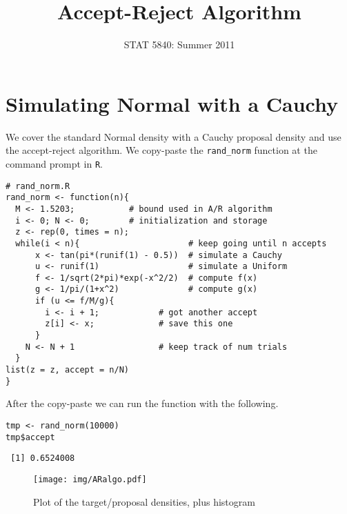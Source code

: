 \documentclass[11pt,english]{article}
\title{Accept-Reject Algorithm}
\date{STAT 5840: Summer 2011}
\begin{document}
\maketitle

\thispagestyle{empty}

\section*{Simulating Normal with a Cauchy}
\label{sec-1}

We cover the standard Normal density with a Cauchy proposal density and use the accept-reject algorithm.  We copy-paste the \texttt{rand\_norm} function at the command prompt in \texttt{R}.

\begin{verbatim}
# rand_norm.R
rand_norm <- function(n){
  M <- 1.5203;           # bound used in A/R algorithm
  i <- 0; N <- 0;        # initialization and storage
  z <- rep(0, times = n);
  while(i < n){                      # keep going until n accepts
      x <- tan(pi*(runif(1) - 0.5))  # simulate a Cauchy
      u <- runif(1)                  # simulate a Uniform
      f <- 1/sqrt(2*pi)*exp(-x^2/2)  # compute f(x)
      g <- 1/pi/(1+x^2)              # compute g(x)
      if (u <= f/M/g){
        i <- i + 1;            # got another accept
        z[i] <- x;             # save this one
      }
    N <- N + 1                 # keep track of num trials
  }
list(z = z, accept = n/N)                     
}
\end{verbatim}
After the copy-paste we can run the function with the following.
\begin{verbatim}
tmp <- rand_norm(10000)
tmp$accept
\end{verbatim}

\begin{verbatim}
 [1] 0.6524008
\end{verbatim}



\begin{figure}[h!]
\centering
\texttt{[image: img/ARalgo.pdf]}
\caption{\label{fig:yplot}Plot of the target/proposal densities, plus histogram}
\end{figure}
\end{document}
